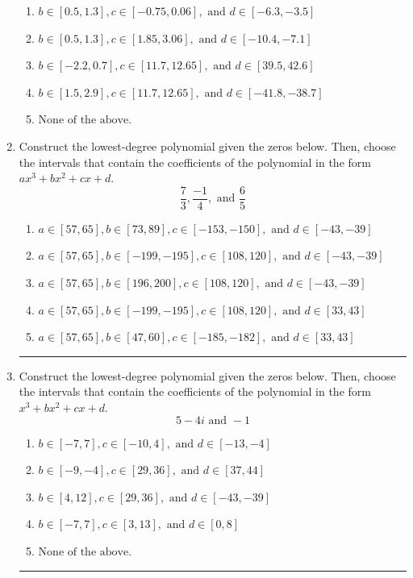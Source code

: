 \documentclass[14pt]{extbook}
\newcommand{\litem}[1]{\item#1\hspace*{-1cm}\rule{\textwidth}{0.4pt}}
\begin{document}
\begin{enumerate}
{\begin{enumerate}[label=\Alph*.]
\item \( b \in [0.5, 1.3], c \in [-0.75, 0.06], \text{ and } d \in [-6.3, -3.5] \)
\item \( b \in [0.5, 1.3], c \in [1.85, 3.06], \text{ and } d \in [-10.4, -7.1] \)
\item \( b \in [-2.2, 0.7], c \in [11.7, 12.65], \text{ and } d \in [39.5, 42.6] \)
\item \( b \in [1.5, 2.9], c \in [11.7, 12.65], \text{ and } d \in [-41.8, -38.7] \)
\item \( \text{None of the above.} \)

\end{enumerate} }
\litem{
Construct the lowest-degree polynomial given the zeros below. Then, choose the intervals that contain the coefficients of the polynomial in the form $ax^3+bx^2+cx+d$.\[ \frac{7}{3}, \frac{-1}{4}, \text{ and } \frac{6}{5} \]\begin{enumerate}[label=\Alph*.]
\item \( a \in [57, 65], b \in [73, 89], c \in [-153, -150], \text{ and } d \in [-43, -39] \)
\item \( a \in [57, 65], b \in [-199, -195], c \in [108, 120], \text{ and } d \in [-43, -39] \)
\item \( a \in [57, 65], b \in [196, 200], c \in [108, 120], \text{ and } d \in [-43, -39] \)
\item \( a \in [57, 65], b \in [-199, -195], c \in [108, 120], \text{ and } d \in [33, 43] \)
\item \( a \in [57, 65], b \in [47, 60], c \in [-185, -182], \text{ and } d \in [33, 43] \)

\end{enumerate} }
\litem{
Construct the lowest-degree polynomial given the zeros below. Then, choose the intervals that contain the coefficients of the polynomial in the form $x^3+bx^2+cx+d$.\[ 5 - 4 i \text{ and } -1 \]\begin{enumerate}[label=\Alph*.]
\item \( b \in [-7, 7], c \in [-10, 4], \text{ and } d \in [-13, -4] \)
\item \( b \in [-9, -4], c \in [29, 36], \text{ and } d \in [37, 44] \)
\item \( b \in [4, 12], c \in [29, 36], \text{ and } d \in [-43, -39] \)
\item \( b \in [-7, 7], c \in [3, 13], \text{ and } d \in [0, 8] \)
\item \( \text{None of the above.} \)


\end{enumerate}}
\end{enumerate}
\end{document}
